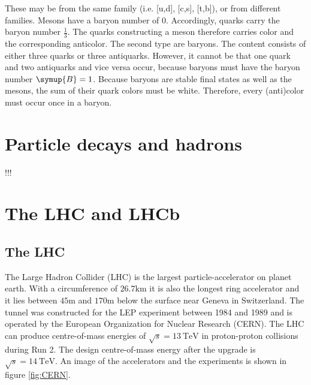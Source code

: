 These may be from the same family (i.e. [u,d], [c,s], [t,b]), or from
different families. Mesons have a baryon number of 0. Accordingly, quarks carry the baryon number $\frac{1}{3}$. The quarks constructing a meson therefore carries color and the corresponding anticolor.
The second type are baryons. The content consists of either three quarks or
three antiquarks. However, it cannot be that one quark and two antiquarks
and vice versa occur, because baryons must have the baryon number $\symup{B} = 1$. Because baryons are stable final states as well as the mesons, the sum of their quark colors must be white. Therefore, every (anti)color must occur once in a baryon.

\section{Particle decays and hadrons}
\label{sec:decays}

!!!

\section{The LHC and LHCb}
\label{sec:lhcandB}

\subsection{The LHC}
The Large Hadron Collider (LHC)\cite{lhcInfo} is the largest particle-accelerator on planet earth. With a circumference of $26.7\si{\kilo\metre}$ it is also the longest ring accelerator and it lies between $45\si{\metre}$ and $170\si{\metre}$ below the surface near Geneva in Switzerland. The tunnel was constructed for the LEP experiment between 1984 and 1989 and is operated by the European Organization for Nuclear Research (CERN). The LHC can produce centre-of-mass energies of $\sqrt{s} = \SI{13}{\tera\electronvolt}$ in proton-proton collisions during Run 2. The design centre-of-mass energy after the upgrade is $\sqrt{s} = \SI{14}{\tera\electronvolt}$.
An image of the accelerators and the experiments is shown in figure \ref{fig:CERN}.

